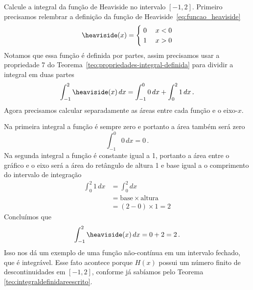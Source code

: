 \begin{example}
  Calcule a integral da função de Heaviside
  no intervalo $[-1, 2]$.
  \solution
  Primeiro precisamos relembrar a definição da função de
  Heaviside~\eqref{eq:funcao_heaviside}
  \[
    \heaviside(x) = \begin{cases}
      \; 0 & \; x < 0 \\
      \; 1 & \; x > 0
    \end{cases}
  \]
  Notamos que essa função é definida por partes, assim precisamos usar
  a propriedade 7 do Teorema~\ref{teo:propriedades-integral-definida}
  para dividir a integral em duas partes
  \[
    \int_{-1}^{2} \heaviside(x) \,dx
    = \int_{-1}^{0} 0 \,dx
    + \int_{0}^{2} 1 \,dx \,.
  \]
  Agora precisamos calcular separadamente as áreas entre cada função e o
  eixo-$x$.

  Na primeira integral a função é sempre zero e portanto a área também
  será zero
  \[
    \int_{-1}^{0} 0 \,dx = 0 \,.
  \]
  Na segunda integral a função é constante igual a 1, portanto a área entre
  o gráfico e o eixo será a área do retângulo de altura 1 e base igual
  a o comprimento do intervalo de integração
  \begin{align*}
    \int_{0}^{2} 1 \,dx
    & = \int_{0}^{2} dx  \\[3mm]
    & = \text{base} \times \text{altura} \\[3mm]
    & = (2-0)\times 1 = 2
  \end{align*}
  Concluímos que
  \[
    \int_{-1}^{2} \heaviside(x) \,dx = 0 + 2 = 2 \,.
  \]
  Isso nos dá um exemplo de uma função não-contínua em um intervalo fechado,
  que é integrável. Esse fato acontece porque $H(x)$ possui um número finito de
  descontinuidades em $[-1, 2]$, conforme já sabíamos pelo Teorema
  \ref{teo:integraldefinidareescrito}.
\end{example}

